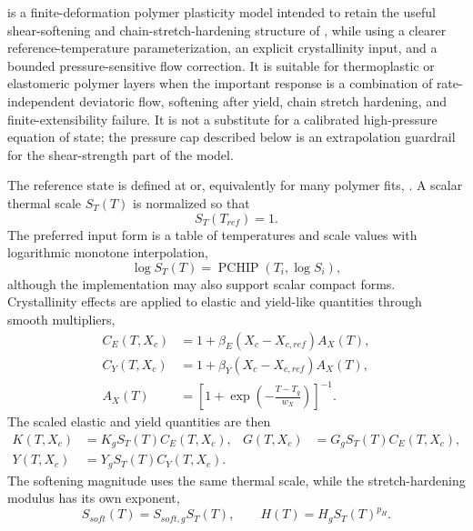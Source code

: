  is a finite-deformation polymer plasticity model intended to retain the useful shear-softening and chain-stretch-hardening structure of , while using a clearer reference-temperature parameterization, an explicit crystallinity input, and a bounded pressure-sensitive flow correction.  It is suitable for thermoplastic or elastomeric polymer layers when the important response is a combination of rate-independent deviatoric flow, softening after yield, chain stretch hardening, and finite-extensibility failure.  It is not a substitute for a calibrated high-pressure equation of state; the pressure cap described below is an extrapolation guardrail for the shear-strength part of the model.

The reference state is defined at  or, equivalently for many polymer fits, .  A scalar thermal scale \(S_T(T)\) is normalized so that
\begin{equation}
  S_T(T_{ref})=1 .
\end{equation}
The preferred input form is a table of temperatures and scale values with logarithmic monotone interpolation,
\begin{equation}
  \log S_T(T)=\operatorname{PCHIP}\left(T_i,\log S_i\right),
  \label{eq:surface-polymer-temperature-scale}
\end{equation}
although the implementation may also support scalar compact forms.  Crystallinity effects are applied to elastic and yield-like quantities through smooth multipliers,
\begin{align}
  C_E(T,X_c) &= 1+\beta_E\left(X_c-X_{c,ref}\right)A_X(T),\\
  C_Y(T,X_c) &= 1+\beta_Y\left(X_c-X_{c,ref}\right)A_X(T),\\
  A_X(T) &= \left[1+\exp\left(-\frac{T-T_g}{w_X}\right)\right]^{-1}.
  \label{eq:surface-polymer-crystallinity}
\end{align}
The scaled elastic and yield quantities are then
\begin{align}
  K(T,X_c) &= K_g S_T(T)C_E(T,X_c), &
  G(T,X_c) &= G_g S_T(T)C_E(T,X_c),\\
  Y(T,X_c) &= Y_g S_T(T)C_Y(T,X_c).
  \label{eq:surface-polymer-scaled-elastic-yield}
\end{align}
The softening magnitude uses the same thermal scale, while the stretch-hardening modulus has its own exponent,
\begin{equation}
  S_{soft}(T)=S_{soft,g}S_T(T),
  \qquad
  H(T)=H_g S_T(T)^{p_H}.
  \label{eq:surface-polymer-softening-hardening-scale}
\end{equation}

